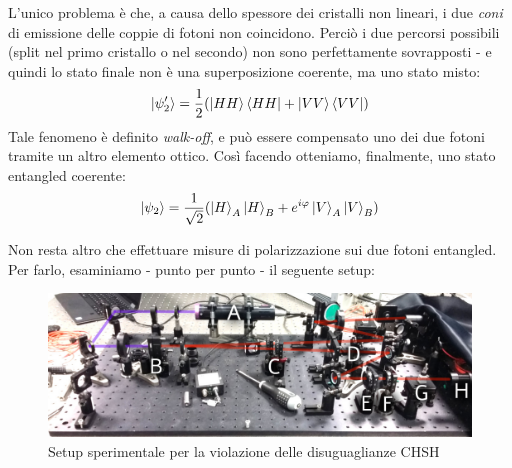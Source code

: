 \documentclass[../../InformazioneQuantistica.tex]{subfiles}
\begin{document}
L'unico problema è che, a causa dello spessore dei cristalli non lineari, i due \textit{coni} di emissione delle coppie di fotoni non coincidono. Perciò i due percorsi possibili (split nel primo cristallo o nel secondo) non sono perfettamente sovrapposti - e quindi lo stato finale non è una superposizione coerente, ma uno stato misto:
\begin{align*}
    \Ket{\psi_2'} = \frac{1}{2}(\Ket{HH}\Bra{HH} + \Ket{VV}\Bra{VV})
\end{align*}
Tale fenomeno è definito \textit{walk-off}, e può essere compensato  uno dei due fotoni tramite un altro elemento ottico. Così facendo otteniamo, finalmente, uno stato entangled coerente:
\begin{align*}
    \Ket{\psi_2} = \frac{1}{\sqrt{2}}(\Ket{H}_A \Ket{H}_B + e^{i\varphi} \Ket{V}_A \Ket{V}_B)
\end{align*}

Non resta altro che effettuare misure di polarizzazione sui due fotoni entangled. Per farlo, esaminiamo - punto per punto - il seguente setup:
\begin{figure}[H]
    \centering
    \includegraphics[width=\textwidth]{Immagini/28_3/Bell_setup.jpg}
    \caption{Setup sperimentale per la violazione delle disuguaglianze CHSH}
    \label{fig:bell-setup}
\end{figure}
\end{document}
